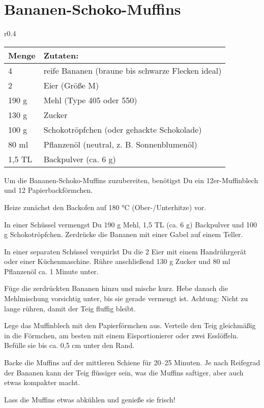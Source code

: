 \documentclass[../../book.tex]{subfiles}
\begin{document}
\section{Bananen-Schoko-Muffins}

\begin{wraptable}{r}{0.4\textwidth}
  \centering
  \begin{tabularx}{0.39\textwidth}{|l|X|}
    \toprule
    Menge & Zutaten: \\
    \midrule
    4 & reife Bananen (braune bis schwarze Flecken ideal) \\
    \midrule
    2 & Eier (Größe M) \\
    \midrule
    190 g & Mehl (Type 405 oder 550) \\
    \midrule
    130 g & Zucker \\
    \midrule
    100 g & Schokotröpfchen (oder gehackte Schokolade) \\
    \midrule
    80 ml & Pflanzenöl (neutral, z. B. Sonnenblumenöl) \\
    \midrule
    1,5 TL & Backpulver (ca. 6 g) \\
    \bottomrule
  \end{tabularx}
\end{wraptable}

Um die Bananen-Schoko-Muffins zuzubereiten, benötigst Du ein 12er-Muffinblech und 12 Papierbackförmchen.

Heize zunächst den Backofen auf 180 °C (Ober-/Unterhitze) vor.

In einer Schüssel vermengst Du 190 g Mehl, 1,5 TL (ca. 6 g) Backpulver und 100 g Schokotröpfchen. Zerdrücke die Bananen mit einer Gabel auf einem Teller.

In einer separaten Schüssel verquirlst Du die 2 Eier mit einem Handrührgerät oder einer Küchenmaschine. Rühre anschließend 130 g Zucker und 80 ml Pflanzenöl ca. 1 Minute unter.

Füge die zerdrückten Bananen hinzu und mische kurz. Hebe danach die Mehlmischung vorsichtig unter, bis sie gerade vermengt ist. Achtung: Nicht zu lange rühren, damit der Teig fluffig bleibt.

Lege das Muffinblech mit den Papierförmchen aus. Verteile den Teig gleichmäßig in die Förmchen, am besten mit einem Eisportionierer oder zwei Esslöffeln. Befülle sie bis ca. 0,5 cm unter den Rand.

Backe die Muffins auf der mittleren Schiene für 20–25 Minuten. Je nach Reifegrad der Bananen kann der Teig flüssiger sein, was die Muffins saftiger, aber auch etwas kompakter macht.

Lass die Muffins etwas abkühlen und genieße sie frisch!
\end{document}
